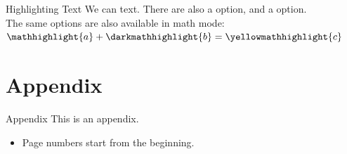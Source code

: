\documentclass{beamer} %
\begin{document}
\begin{frame}{Highlighting Text}
    We can  text. There are also a  option, and a  option.\\
    The same options are also available in math mode: $\mathhighlight{a} + \darkmathhighlight{b} = \yellowmathhighlight{c}$
\end{frame}


\appendix

\section{Appendix}

\begin{frame}{Appendix}
    This is an appendix.
    \begin{itemize}
        \item Page numbers start from the beginning.
    \end{itemize}
\end{frame}
\end{document}
